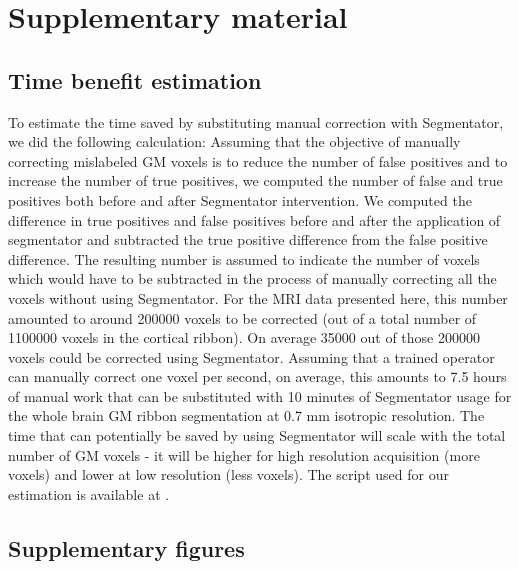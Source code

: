 \clearpage
\section{Supplementary material}
\subsection{Time benefit estimation}
\label{sec:S1_Appendix}
To estimate the time saved by substituting manual correction with Segmentator, we did the following calculation: Assuming that the objective of manually correcting mislabeled GM voxels is to reduce the number of false positives and to increase the number of true positives, we computed the number of false and true positives both before and after Segmentator intervention. We computed the difference in true positives and false positives before and after the application of segmentator and subtracted the true positive difference from the false positive difference. The resulting number is assumed to indicate the number of voxels which would have to be subtracted in the process of manually correcting all the voxels without using Segmentator. For the MRI data presented here, this number amounted to around 200000 voxels to be corrected (out of a total number of 1100000 voxels in the cortical ribbon). On average 35000 out of those 200000 voxels could be corrected using Segmentator. Assuming that a trained operator can manually correct one voxel per second, on average, this amounts to 7.5 hours of manual work that can be substituted with 10 minutes of Segmentator usage for the whole brain GM ribbon segmentation at 0.7 mm isotropic resolution. The time that can potentially be saved by using Segmentator will scale with the total number of GM voxels - it will be higher for high resolution acquisition (more voxels) and lower at low resolution (less voxels). The script used for our estimation is available at \cite{segmentator_processing_scripts}.

\clearpage
\subsection{Supplementary figures}
\beginsupplement

